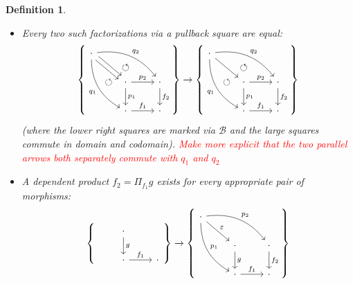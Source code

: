 \documentclass{article}
\newcommand{\todo}[1]{\textcolor{red}{#1}}
\newtheorem{definition}{Definition}
\begin{document}
\begin{definition}
\begin{itemize}
    \item
      Every two such factorizations via a pullback square are equal:
      \begin{equation}
        \left\{
          \begin{tikzcd}
            \cdot \arrow[ddr, bend right, "q_1"'] \arrow[ddr, phantom, "\circlearrowleft"] \arrow[drr, bend left, "q_2"] \arrow[drr, phantom, "\circlearrowleft"] \arrow[dr, shift left] \arrow[dr, shift right] \\
            & \cdot \arrow[d, "p_1"] \arrow[r, "p_2"] & \cdot \arrow[d, "f_2"] \\
            & \cdot \arrow[r, "f_1"] & \cdot
          \end{tikzcd}
        \right\}
        \rightarrow
        \left\{
          \begin{tikzcd}
            \cdot \arrow[ddr, bend right, "q_1"'] \arrow[ddr, phantom, "\circlearrowleft"] \arrow[drr, bend left, "q_2"] \arrow[drr, phantom, "\circlearrowleft"] \arrow[dr] \\
            & \cdot \arrow[d, "p_1"] \arrow[r, "p_2"] & \cdot \arrow[d, "f_2"] \\
            & \cdot \arrow[r, "f_1"] & \cdot
          \end{tikzcd}
        \right\}
      \end{equation}
      (where the lower right squares are marked via $\mathcal{B}$ and the large squares commute in domain and codomain).
      \todo{Make more explicit that the two parallel arrows both separately commute with $q_1$ and $q_2$}
    \item
      A dependent product $f_2 = \Pi_{f_1} g$ exists for every appropriate pair of morphisms:
      \begin{equation}
        \left\{
          \begin{tikzcd}
            & \cdot \arrow[d, "g"] \\
            & \cdot \arrow[r, "f_1"] & \cdot
          \end{tikzcd}
        \right\}
        \rightarrow
        \left\{
          \begin{tikzcd}
            \cdot \arrow[ddr, bend right, "p_1"] \arrow[drr, bend left, "p_2"] \arrow[dr, "\varepsilon"] \\
            & \cdot \arrow[d, "g"] & \cdot \arrow[d, "f_2"] \\
            & \cdot \arrow[r, "f_1"] & \cdot
          \end{tikzcd}
        \right\}
      \end{equation}

\end{itemize}
\end{definition}
\end{document}
